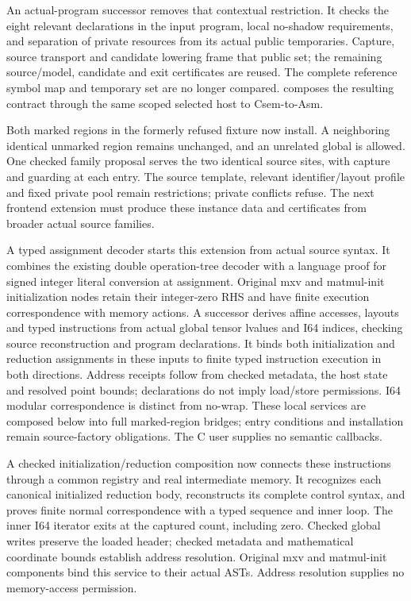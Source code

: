 An actual-program successor removes that contextual restriction. It checks the
eight relevant declarations in the input program, local no-shadow requirements,
and separation of private resources from its actual public temporaries.
Capture, source transport and candidate lowering frame that public set;
the remaining source/model, candidate and exit certificates are reused.
The complete reference symbol map and temporary set are no longer compared.
 composes the resulting
contract through the same scoped selected host to Csem-to-Asm.

Both marked regions in the formerly refused fixture now install. A neighboring
identical unmarked region remains unchanged, and an unrelated global is allowed.
One checked family proposal serves the two identical source sites, with capture
and guarding at each entry. The source template, relevant identifier/layout
profile and fixed private pool remain restrictions; private conflicts refuse.
The next frontend extension must produce these instance data and certificates
from broader actual source families.

A typed assignment decoder starts this extension from actual source syntax.
It combines the existing double operation-tree decoder with a language proof
for signed integer literal conversion at assignment. Original mxv and
matmul-init initialization nodes retain their integer-zero RHS and have finite
execution correspondence with memory actions. A successor derives affine
accesses, layouts and typed instructions from actual global tensor lvalues and
I64 indices, checking source reconstruction and program declarations. It binds
both initialization and reduction assignments in these inputs to finite typed
instruction execution in both directions. Address receipts follow from checked
metadata, the host state and resolved point bounds; declarations do not imply
load/store permissions. I64 modular correspondence is distinct from no-wrap.
These local services are composed below into full marked-region bridges;
entry conditions and installation remain source-factory obligations. The C
user supplies no semantic callbacks.

A checked initialization/reduction composition now connects these instructions
through a common registry and real intermediate memory. It recognizes each
canonical initialized reduction body, reconstructs its complete control syntax,
and proves finite normal correspondence with a typed sequence and inner loop.
The inner I64 iterator exits at the captured count, including zero. Checked
global writes preserve the loaded header; checked metadata and mathematical
coordinate bounds establish address resolution. Original mxv and matmul-init
components bind this service to their actual ASTs. Address resolution supplies
no memory-access permission.

